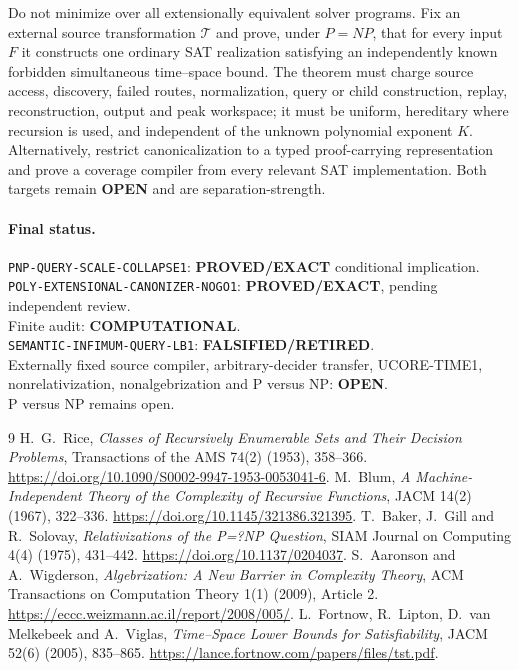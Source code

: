 \documentclass[11pt]{article}
\newcommand{\EXACT}{\textbf{PROVED/EXACT}}
\newcommand{\OPEN}{\textbf{OPEN}}
\newcommand{\RETIRED}{\textbf{FALSIFIED/RETIRED}}
\newcommand{\COMP}{\textbf{COMPUTATIONAL}}
\begin{document}
Do not minimize over all extensionally equivalent solver programs.  Fix an
external source transformation $\mathcal T$ and prove, under $P=NP$, that for
every input $F$ it constructs one ordinary SAT realization satisfying an
independently known forbidden simultaneous time--space bound.  The theorem
must charge source access, discovery, failed routes, normalization, query or
child construction, replay, reconstruction, output and peak workspace; it
must be uniform, hereditary where recursion is used, and independent of the
unknown polynomial exponent $K$.  Alternatively, restrict canonicalization
to a typed proof-carrying representation and prove a coverage compiler from
every relevant SAT implementation.  Both targets remain \OPEN{} and are
separation-strength.

\paragraph{Final status.}
\texttt{PNP-QUERY-SCALE-COLLAPSE1}: \EXACT{} conditional implication.\\
\texttt{POLY-EXTENSIONAL-CANONIZER-NOGO1}: \EXACT, pending independent review.\\
Finite audit: \COMP.\\
\texttt{SEMANTIC-INFIMUM-QUERY-LB1}: \RETIRED.\\
Externally fixed source compiler, arbitrary-decider transfer, UCORE-TIME1,
nonrelativization, nonalgebrization and P versus NP: \OPEN.\\
P versus NP remains open.

\begin{thebibliography}{9}
 H.~G.~Rice,
\emph{Classes of Recursively Enumerable Sets and Their Decision Problems},
Transactions of the AMS 74(2) (1953), 358--366.
\url{https://doi.org/10.1090/S0002-9947-1953-0053041-6}.
 M.~Blum,
\emph{A Machine-Independent Theory of the Complexity of Recursive Functions},
JACM 14(2) (1967), 322--336.
\url{https://doi.org/10.1145/321386.321395}.
 T.~Baker, J.~Gill and R.~Solovay,
\emph{Relativizations of the P=?NP Question}, SIAM Journal on Computing
4(4) (1975), 431--442. \url{https://doi.org/10.1137/0204037}.
 S.~Aaronson and A.~Wigderson,
\emph{Algebrization: A New Barrier in Complexity Theory}, ACM Transactions on
Computation Theory 1(1) (2009), Article 2.
\url{https://eccc.weizmann.ac.il/report/2008/005/}.
 L.~Fortnow, R.~Lipton, D.~van Melkebeek and A.~Viglas,
\emph{Time--Space Lower Bounds for Satisfiability}, JACM 52(6) (2005),
835--865. \url{https://lance.fortnow.com/papers/files/tst.pdf}.
\end{thebibliography}

\end{document}
